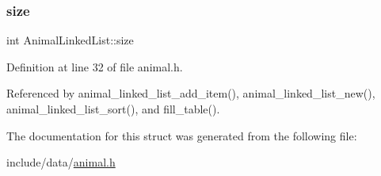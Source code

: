 \mbox{\label{struct_animal_linked_list_a28ace4cc471481a60e6a9bb41c9de892}} 
\subsubsection{\texorpdfstring{size}{size}}
{\footnotesize\ttfamily int Animal\+Linked\+List\+::size}



Definition at line 32 of file animal.\+h.



Referenced by animal\+\_\+linked\+\_\+list\+\_\+add\+\_\+item(), animal\+\_\+linked\+\_\+list\+\_\+new(), animal\+\_\+linked\+\_\+list\+\_\+sort(), and fill\+\_\+table().



The documentation for this struct was generated from the following file\+:\begin{DoxyCompactItemize}
\item 
include/data/\mbox{\hyperlink{animal_8h}{animal.\+h}}\end{DoxyCompactItemize}
